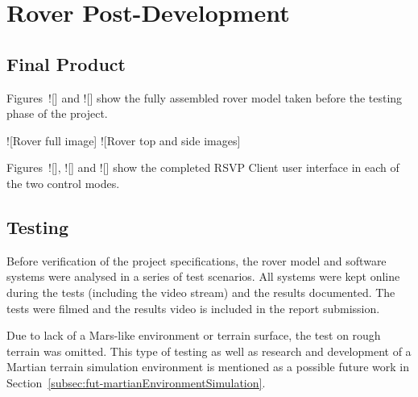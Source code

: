 \chapter{Rover Post-Development}
\label{chap:roverPostDev}
  \section{Final Product}
    Figures~![] and ![] show the fully assembled rover model taken before the testing phase of the project.
    
    ![Rover full image]
    ![Rover top and side images]
    
    Figures~![], ![] and ![] show the completed RSVP Client user interface in each of the two control modes.
  
  \section{Testing}
    Before verification of the project specifications, the rover model and software systems were analysed in a series of test scenarios. All systems were kept online during the tests (including the video stream) and the results documented. The tests were filmed and the results video is included in the report submission.
    
    Due to lack of a Mars-like environment or terrain surface, the test on rough terrain was omitted. This type of testing as well as research and development of a Martian terrain simulation environment is mentioned as a possible future work in Section~\ref{subsec:fut-martianEnvironmentSimulation}.
    
